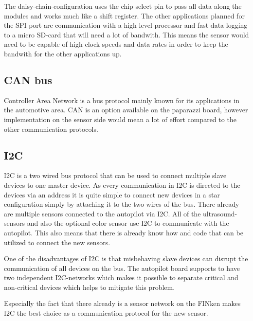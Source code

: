 The daisy-chain-configuration uses the chip select pin to pass all data along the modules and works much like a shift register.
The other applications planned for the SPI port are communication with a high level processor and fast data logging to a micro SD-card that will need a lot of bandwith.
This means the sensor would need to be capable of high clock speeds and data rates in order to keep the bandwith for the other applications up.


\subsection{CAN bus}
Controller Area Network is a bus protocol mainly known for its applications in the automotive area.
CAN is an option available on the paparazzi board, however implementation on the sensor side would mean a lot of effort compared to the other communication protocols.

\subsection{I2C}

I2C is a two wired bus protocol that can be used to connect multiple slave devices to one master device.
As every communication in I2C is directed to the devices via an address it is quite simple to connect new devices in a star configuration simply by attaching it to the two wires of the bus.
There already are multiple sensors connected to the autopilot via I2C.
All of the ultrasound-sensors and also the optional color sensor use I2C to communicate with the autopilot.
This also means that there is already know how and code that can be utilized to connect the new sensors.

One of the disadvantages of I2C is that misbehaving slave devices can disrupt the communication of all devices on the bus.
The autopilot board supports to have two independent I2C-networks which makes it possible to separate critical and non-critical devices which helps to mitigate this problem.

Especially the fact that there already is a sensor network on the FINken makes I2C the best choice as a communication protocol for the new sensor.
